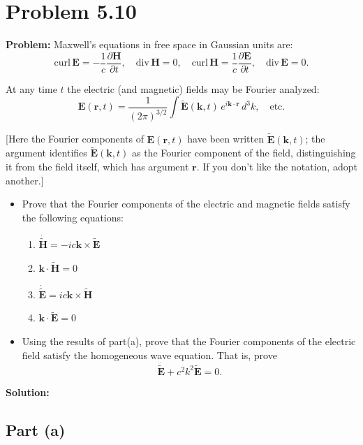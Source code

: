 \documentclass[12pt]{article}
\begin{document}
\section*{Problem 5.10}

\textbf{Problem:} Maxwell's equations in free space in Gaussian units are:
\[
\text{curl}\,\mathbf{E} = -\frac{1}{c}\frac{\partial\mathbf{H}}{\partial t}, \quad \text{div}\,\mathbf{H} = 0, \quad \text{curl}\,\mathbf{H} = \frac{1}{c}\frac{\partial\mathbf{E}}{\partial t}, \quad \text{div}\,\mathbf{E} = 0.
\]

At any time $t$ the electric (and magnetic) fields may be Fourier analyzed:
\[
\mathbf{E}(\mathbf{r},t) = \frac{1}{(2\pi)^{3/2}}\int \tilde{\mathbf{E}}(\mathbf{k},t)\,e^{i\mathbf{k}\cdot\mathbf{r}}\,d^3k, \quad \text{etc.}
\]

[Here the Fourier components of $\mathbf{E}(\mathbf{r},t)$ have been written $\tilde{\mathbf{E}}(\mathbf{k},t)$; the argument identifies $\tilde{\mathbf{E}}(\mathbf{k},t)$ as the Fourier component of the field, distinguishing it from the field itself, which has argument $\mathbf{r}$. If you don't like the notation, adopt another.]

\begin{itemize}
\item[(a)] Prove that the Fourier components of the electric and magnetic fields satisfy the following equations:
\begin{enumerate}
\item[i)] $\dot{\tilde{\mathbf{H}}} = -ic\mathbf{k}\times\tilde{\mathbf{E}}$
\item[ii)] $\mathbf{k}\cdot\tilde{\mathbf{H}} = 0$
\item[iii)] $\dot{\tilde{\mathbf{E}}} = ic\mathbf{k}\times\tilde{\mathbf{H}}$
\item[iv)] $\mathbf{k}\cdot\tilde{\mathbf{E}} = 0$
\end{enumerate}

\item[(b)] Using the results of part(a), prove that the Fourier components of the electric field satisfy the homogeneous wave equation. That is, prove
\[
\ddot{\tilde{\mathbf{E}}} + c^2k^2\tilde{\mathbf{E}} = 0.
\]
\end{itemize}

\bigskip
\textbf{Solution:}

\subsection*{Part (a)}
\end{document}
